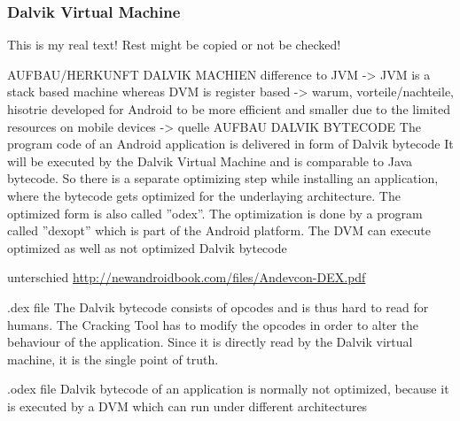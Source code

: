 \subsubsection{Dalvik Virtual Machine} \label{subsubsection:android-evolution-dvm}
This is my real text! Rest might be copied or not be checked!








AUFBAU/HERKUNFT DALVIK MACHIEN\newline
difference to JVM -> JVM is a stack based machine whereas DVM is register based -> warum, vorteile/nachteile, hisotrie\newline
developed for Android to be more efficient and smaller due to the limited resources on mobile devices -> quelle\newline
AUFBAU DALVIK BYTECODE\newline
The program code of an Android application is delivered in form of Dalvik bytecode\newline
It will be executed by the Dalvik Virtual Machine and is comparable to Java bytecode. So there is a separate
optimizing step while installing an application, where the bytecode gets optimized for the underlaying architecture. The optimized form is also called ”odex”. The optimization is done by a program called ”dexopt” which is part of the Android platform. The DVM can execute optimized as well as not optimized Dalvik bytecode\newline

unterschied \url{http://newandroidbook.com/files/Andevcon-DEX.pdf}\newline

.dex file
The Dalvik bytecode consists of opcodes and is thus hard to read for humans. The Cracking Tool has to modify the opcodes in order to alter the behaviour of the application. Since it is directly read by the Dalvik virtual machine, it is the single point of truth.\newline

.odex file
Dalvik bytecode of an application is normally not optimized, because it is executed by a DVM which can run under different architectures\newline

